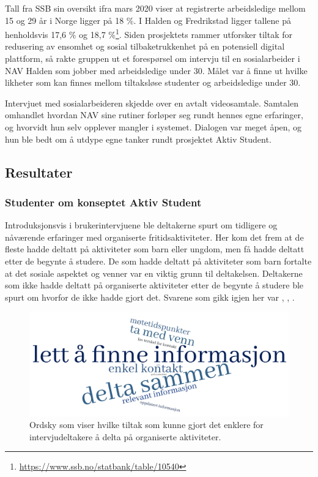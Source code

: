 Tall fra SSB sin oversikt ifra mars 2020 viser at registrerte arbeidsledige mellom 15 og 29 år i Norge ligger på 18 \%. I Halden og Fredrikstad ligger tallene på henholdsvis 17,6 \% og 18,7 \%\footnote{\url{https://www.ssb.no/statbank/table/10540}}. 
Siden prosjektets rammer utforsker tiltak for redusering av ensomhet og sosial tilbaketrukkenhet på en potensiell digital plattform, så rakte gruppen ut et forespørsel om intervju til en sosialarbeider i NAV Halden som jobber med arbeidsledige under 30. Målet var å finne ut hvilke likheter som kan finnes mellom tiltaksløse studenter og arbeidsledige under 30.

Intervjuet med sosialarbeideren skjedde over en avtalt videosamtale. Samtalen omhandlet hvordan NAV sine rutiner forløper seg rundt hennes egne erfaringer, og hvorvidt hun selv opplever mangler i systemet. Dialogen var meget åpen, og hun ble bedt om å utdype egne tanker rundt prosjektet Aktiv Student.

\subsection{Resultater}

\subsubsection{Studenter om konseptet Aktiv Student}
Introduksjonsvis i brukerintervjuene ble deltakerne spurt om tidligere og nåværende erfaringer med organiserte fritidsaktiviteter. Her kom det frem at de fleste hadde deltatt på aktiviteter som barn eller ungdom, men få hadde deltatt etter de begynte å studere. De som hadde deltatt på aktiviteter som barn fortalte at det sosiale aspektet og venner var en viktig grunn til deltakelsen. Deltakerne som ikke hadde deltatt på organiserte aktiviteter etter de begynte å studere ble spurt om hvorfor de ikke hadde gjort det. Svarene som gikk igjen her var , , .

\begin{figure}[H]
\includegraphics[width=\textwidth]{Illustrasjoner/ordsky-tiltak.jpg}
\caption{Ordsky som viser hvilke tiltak som kunne gjort det enklere for intervjudeltakere å delta på organiserte aktiviteter.}
\label{fig:ordsky-tiltak}
\end{figure}

